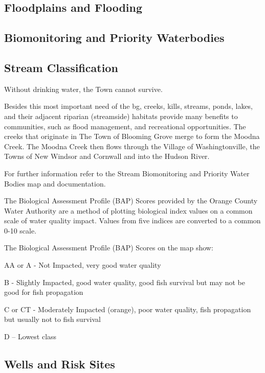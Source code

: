 



\subsection{Floodplains and Flooding}
\subsection{Biomonitoring and Priority Waterbodies}
\subsection{Stream Classification}
Without drinking water, the Town cannot survive. 

Besides this most important need of the \gls{bg}, creeks, kills, streams, ponds, lakes, and their adjacent riparian (streamside) habitats provide many benefits to communities, such as flood management, and recreational opportunities. The creeks that originate in The Town of Blooming Grove merge to form the Moodna Creek.  The Moodna Creek then flows through the Village of Washingtonville, the Towns of New Windsor and Cornwall and into the Hudson River. 

For further information refer to the Stream Biomonitoring and Priority Water Bodies map and documentation.

%
The Biological Assessment Profile (BAP) Scores provided by the Orange County Water Authority are a method of plotting biological index values on a common scale of water quality impact. Values from five indices are converted to a common 0-10 scale.  

The Biological Assessment Profile (BAP) Scores on the map show: 

AA or A - Not Impacted, very good water quality 

B - Slightly Impacted, good water quality, good fish survival but may not be good for fish propagation 

C or CT - Moderately Impacted (orange), poor water quality, fish propagation but usually not to fish survival

D – Lowest class 
\subsection{Wells and Risk Sites}

